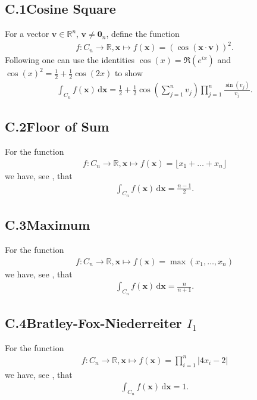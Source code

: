 \documentclass[11pt]{article}
\def\R{\mathbb{R}}
\def\bfx{\bm{x}}
\def\bfv{\bm{v}}
\def\d{\,\mathrm{d}}
\def\bx{\mathbf{x}}
\begin{document}
\subsection*{C.1\hspace{0.5cm}Cosine Square}
For a vector $\bfv\in\R^n$, $\bfv\neq \mathbf{0}_n$, define the function
\begin{align*}
f\colon C_{n}\to\R, \bx \mapsto f(\bx) = (\cos\left(\bfx\cdot\bfv\right))^2.
\end{align*}
Following \cite{IntegralCos2} one can use the identities $\cos(x)=\Re(e^{ix})$ and $\cos(x)^2 = \frac{1}{2}+\frac{1}{2}\cos(2x)$ to show
\begin{align*}
\int_{C_{n}} f(\bx) \d\bx =\frac{1}{2}+\frac{1}{2}\cos\left(\sum_{j=1}^{n}v_j\right)\prod_{j=1}^{n}\frac{\sin(v_j)}{v_j}.
\end{align*}
%
%
%
\subsection*{C.2\hspace{0.5cm}Floor of Sum}
For the function
\begin{align*}
f\colon C_{n}\to\R, \bx \mapsto f(\bx) = \lfloor x_1 + \ldots + x_n \rfloor
\end{align*}
we have, see \cite{IntegralFloorCube}, that
\begin{align*}
\int_{C_{n}} f(\bx) \d\bx = \frac{n-1}{2}.
\end{align*}
%
%
\subsection*{C.3\hspace{0.5cm}Maximum}
For the function
\begin{align*}
f\colon C_{n}\to\R, \bx \mapsto f(\bx) = \max(x_1,\ldots,x_n)
\end{align*}
we have, see \cite{IntegralCubeMax}, that
\begin{align*}
\int_{C_{n}} f(\bx) \d\bx = \frac{n}{n+1}.
\end{align*}
%
%
\subsection*{C.4\hspace{0.5cm}Bratley-Fox-Niederreiter $I_1$}
For the function
\begin{align*}
f\colon C_{n}\to\R, \bx \mapsto f(\bx) = \prod^{n}_{i=1} \vert 4x_i-2\vert
\end{align*}
we have, see \cite[p. 207]{BratleyFoxNiederreiter1992}, that
\begin{align*}
\int_{C_{n}} f(\bx) \d\bx = 1.
\end{align*}
\end{document}
